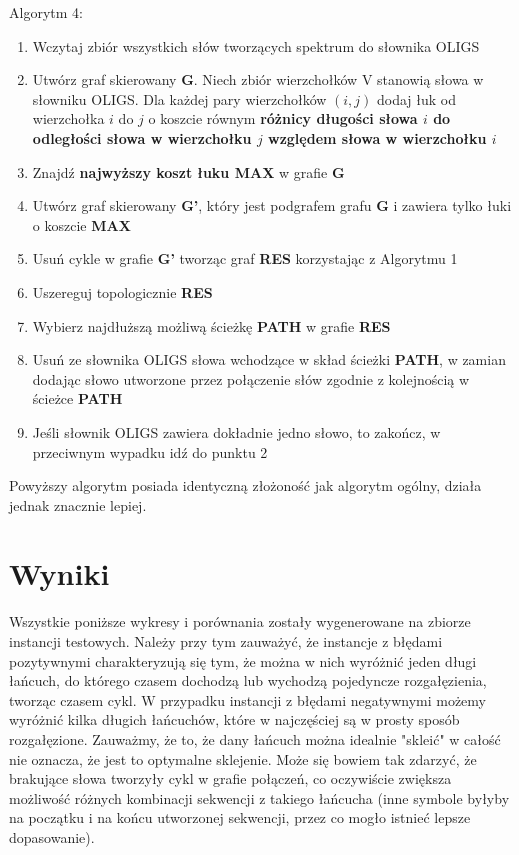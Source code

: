 \documentclass[a4paper,10pt]{article}
\begin{document}
Algorytm 4:
\begin{enumerate}
 \item Wczytaj zbiór wszystkich słów tworzących spektrum do słownika OLIGS
 \item Utwórz graf skierowany {\bf G}. Niech zbiór wierzchołków V stanowią słowa w słowniku OLIGS. Dla każdej pary wierzchołków $(i,j)$ dodaj łuk od wierzchołka $i$ do $j$ o koszcie równym {\bf różnicy długości słowa $i$ do odległości słowa w wierzchołku $j$ względem słowa w wierzchołku $i$}
 \item Znajdź {\bf najwyższy koszt łuku MAX} w grafie {\bf G}
 \item Utwórz graf skierowany {\bf G'}, który jest podgrafem grafu {\bf G} i zawiera tylko łuki o koszcie {\bf MAX}
 \item Usuń cykle w grafie {\bf G'} tworząc graf {\bf RES} korzystając z Algorytmu 1
 \item Uszereguj topologicznie {\bf RES}
 \item Wybierz najdłuższą możliwą ścieżkę {\bf PATH} w grafie {\bf RES}
 \item Usuń ze słownika OLIGS słowa wchodzące w skład ścieżki {\bf PATH}, w zamian dodając słowo utworzone przez połączenie słów zgodnie z kolejnością w ścieżce {\bf PATH}
 \item Jeśli słownik OLIGS zawiera dokładnie jedno słowo, to zakończ, w przeciwnym wypadku idź do punktu 2
\end{enumerate}

Powyższy algorytm posiada identyczną złożoność jak algorytm ogólny, działa jednak znacznie lepiej.

\section{Wyniki}

Wszystkie poniższe wykresy i porównania zostały wygenerowane na zbiorze instancji testowych. Należy przy tym zauważyć, że instancje z błędami pozytywnymi charakteryzują się tym, że można w nich wyróżnić jeden długi łańcuch, do którego czasem dochodzą lub wychodzą pojedyncze rozgałęzienia, tworząc czasem cykl. W przypadku instancji z błędami negatywnymi możemy wyróżnić kilka długich łańcuchów, które w najczęściej są w prosty sposób rozgałęzione. Zauważmy, że to, że dany łańcuch można idealnie "skleić" w całość nie oznacza, że jest to optymalne sklejenie. Może się bowiem tak zdarzyć, że brakujące słowa tworzyły cykl w grafie połączeń, co oczywiście zwiększa możliwość różnych kombinacji sekwencji z takiego łańcucha (inne symbole byłyby na początku i na końcu utworzonej sekwencji, przez co mogło istnieć lepsze dopasowanie).
\end{document}
